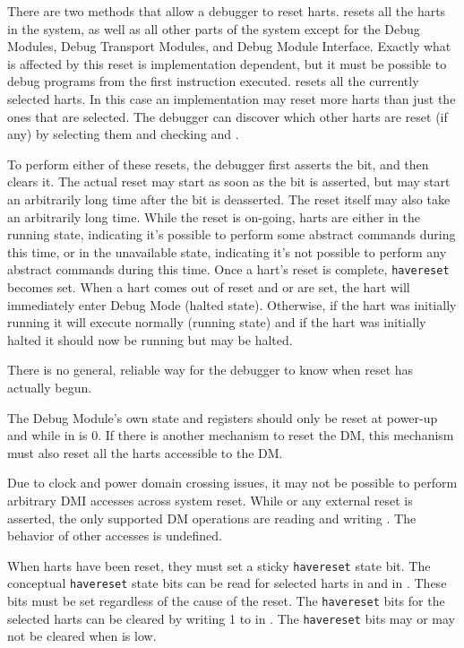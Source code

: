 There are two methods that allow a debugger to reset harts.
\FdmDmcontrolNdmreset resets all the harts in the system, as well as all other
parts of the system except for the Debug Modules, Debug Transport Modules,
and Debug Module Interface.
Exactly what is affected by this reset is implementation dependent, but it
must be possible to debug programs from the first instruction executed.
\FdmDmcontrolHartreset resets all the currently selected harts. In this case an
implementation may reset more harts than just the ones that are selected. The
debugger can discover which other harts are reset (if any) by selecting them
and checking \FdmDmstatusAnyhavereset and \FdmDmstatusAllhavereset.

To perform either of these resets, the debugger first asserts the bit, and then
clears it. The actual reset may start as soon as the bit is asserted, but may
start an arbitrarily long time after the bit is deasserted. The reset itself
may also take an arbitrarily long time.  While the reset is
on-going, harts are either in the running state, indicating it's possible to
perform some abstract commands during this time, or in the unavailable state,
indicating it's not possible to perform any abstract commands during this time.
Once a hart's reset is complete, {\tt havereset} becomes set.  When a hart comes out
of reset and \FdmDmcontrolHaltreq or \Fresethaltreq are set, the hart will
immediately enter Debug Mode (halted state).
Otherwise, if the hart was initially running it will execute normally (running state)
and if the hart was initially halted it should now be running but may be halted.

\begin{commentary}
    There is no general, reliable way for the debugger to know when reset has
    actually begun.
\end{commentary}

The Debug Module's own state and registers should only be
reset at power-up and while
\FdmDmcontrolDmactive in \RdmDmcontrol is 0. If there is another mechanism to
reset the DM, this mechanism must also reset all the harts accessible to the
DM.

Due to clock and power domain crossing issues,
it may not be possible to perform arbitrary DMI accesses across
system reset.
While \FdmDmcontrolNdmreset or any external reset is asserted, the only supported DM
operations are reading and writing \RdmDmcontrol. The behavior of other accesses
is undefined.

When harts have been reset, they must set a sticky {\tt havereset} state bit.
The conceptual {\tt havereset} state bits can be read for selected harts in
\FdmDmstatusAnyhavereset and \FdmDmstatusAllhavereset in \RdmDmstatus.
These bits must be set regardless of the cause of the reset.
The {\tt havereset} bits for the selected harts
can be cleared by writing 1 to \FdmDmcontrolAckhavereset in \RdmDmcontrol.
The {\tt havereset} bits may or may not be cleared
when \FdmDmcontrolDmactive is low.

